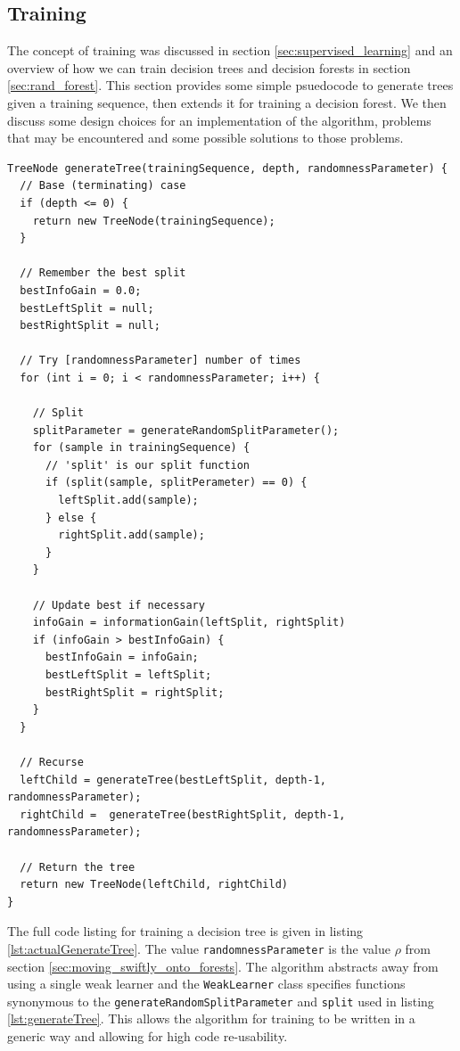 \documentclass[12pt,twoside,notitlepage]{report}
\begin{document}
      \subsection{Training} \label{sec:training}
          The concept of training was discussed in section \ref{sec:supervised_learning} and an overview of 
          how we can train decision trees and decision forests in section \ref{sec:rand_forest}. This section provides 
          some simple psuedocode to generate trees given a training sequence, then extends it for training a decision forest. We 
          then discuss some design choices for an implementation of the algorithm, problems that may be encountered and 
          some possible solutions to those problems.

          \begin{lstlisting}[float=tp,caption={Psuedocode to train a decision tree.}, label={lst:generateTree}]
TreeNode generateTree(trainingSequence, depth, randomnessParameter) {
  // Base (terminating) case
  if (depth <= 0) {
    return new TreeNode(trainingSequence);
  }

  // Remember the best split
  bestInfoGain = 0.0;
  bestLeftSplit = null;
  bestRightSplit = null;

  // Try [randomnessParameter] number of times
  for (int i = 0; i < randomnessParameter; i++) {
    
    // Split
    splitParameter = generateRandomSplitParameter();
    for (sample in trainingSequence) {
      // 'split' is our split function
      if (split(sample, splitPerameter) == 0) {
        leftSplit.add(sample);
      } else {
        rightSplit.add(sample);
      }
    }

    // Update best if necessary
    infoGain = informationGain(leftSplit, rightSplit)
    if (infoGain > bestInfoGain) {
      bestInfoGain = infoGain;
      bestLeftSplit = leftSplit;
      bestRightSplit = rightSplit;
    }
  }

  // Recurse
  leftChild = generateTree(bestLeftSplit, depth-1, randomnessParameter);
  rightChild =  generateTree(bestRightSplit, depth-1, randomnessParameter);

  // Return the tree
  return new TreeNode(leftChild, rightChild)
}
          \end{lstlisting}

          \clearpage
          The full code listing for training a decision tree is given in listing \ref{lst:actualGenerateTree}. The value 
          \texttt{randomnessParameter} is the value $\rho$ from section \ref{sec:moving_swiftly_onto_forests}. The algorithm 
          abstracts away from using a single weak learner and the \texttt{WeakLearner} class specifies functions 
          synonymous to the \texttt{generateRandomSplitParameter} and \texttt{split} used in listing \ref{lst:generateTree}.
          This allows the algorithm for training to be written in a generic way and allowing for high code re-usability. 
\end{document}
